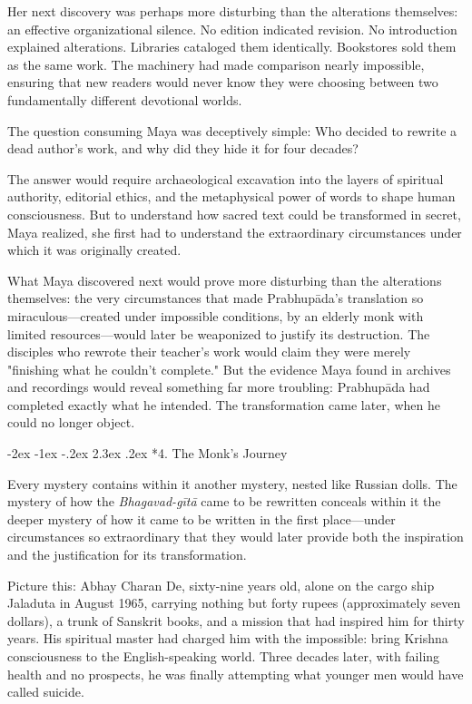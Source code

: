 \documentclass[12pt,twoside]{book}
\makeatletter
\renewcommand\section{\@startsection{section}{1}{\z@}%
{-3.5ex \@plus -1ex \@minus -.2ex}%
{2.3ex \@plus.2ex}%
{\normalfont\Large\bfseries}}
\let\oldsection\section
\renewcommand{\section}[1]{\needspace{4\baselineskip}\oldsection{#1}}
\def\cleardoublepage{\clearpage\if@twoside \ifodd\c@page\else\hbox{}\thispagestyle{empty}\newpage\if@twocolumn\hbox{}\newpage\fi\fi\fi}
\renewcommand\section{\@startsection{section}{1}{\z@}%
{-2ex \@plus -1ex \@minus -.2ex}%
{2.3ex \@plus.2ex}%
{\normalfont\Large\bfseries}}
\makeatother
\begin{document}
Her next discovery was perhaps more disturbing than the alterations themselves: an effective organizational silence. No edition indicated revision. No introduction explained alterations. Libraries cataloged them identically. Bookstores sold them as the same work. The machinery had made comparison nearly impossible, ensuring that new readers would never know they were choosing between two fundamentally different devotional worlds.

The question consuming Maya was deceptively simple: Who decided to rewrite a dead author's work, and why did they hide it for four decades?

The answer would require archaeological excavation into the layers of spiritual authority, editorial ethics, and the metaphysical power of words to shape human consciousness. But to understand how sacred text could be transformed in secret, Maya realized, she first had to understand the extraordinary circumstances under which it was originally created.

What Maya discovered next would prove more disturbing than the alterations themselves: the very circumstances that made Prabhupāda's translation so miraculous—created under impossible conditions, by an elderly monk with limited resources—would later be weaponized to justify its destruction. The disciples who rewrote their teacher's work would claim they were merely "finishing what he couldn't complete." But the evidence Maya found in archives and recordings would reveal something far more troubling: Prabhupāda had completed exactly what he intended. The transformation came later, when he could no longer object.

\cleardoublepage
\vspace*{0.20\textheight}
\section*{4. The Monk's Journey}
\thispagestyle{chapterpage}

\normalfont\justifying
Every mystery contains within it another mystery, nested like Russian dolls. The mystery of how the \emph{Bhagavad-gītā} came to be rewritten conceals within it the deeper mystery of how it came to be written in the first place—under circumstances so extraordinary that they would later provide both the inspiration and the justification for its transformation.

Picture this: Abhay Charan De, sixty-nine years old, alone on the cargo ship Jaladuta in August 1965, carrying nothing but forty rupees (approximately seven dollars), a trunk of Sanskrit books, and a mission that had inspired him for thirty years. His spiritual master had charged him with the impossible: bring Krishna consciousness to the English-speaking world. Three decades later, with failing health and no prospects, he was finally attempting what younger men would have called suicide.
\end{document}
